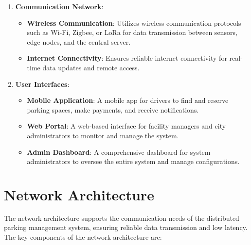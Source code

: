 \documentclass[oneside, 12pt, a4paper, draft]{book}
\begin{document}
\begin{enumerate}
\item \textbf{\textbf{Communication Network}}:
\begin{itemize}
\item \textbf{\textbf{Wireless Communication}}: Utilizes wireless communication protocols such as Wi-Fi, Zigbee, or LoRa for data transmission between sensors, edge nodes, and the central server.
\item \textbf{\textbf{Internet Connectivity}}: Ensures reliable internet connectivity for real-time data updates and remote access.
\end{itemize}

\item \textbf{\textbf{User Interfaces}}:
\begin{itemize}
\item \textbf{\textbf{Mobile Application}}: A mobile app for drivers to find and reserve parking spaces, make payments, and receive notifications.
\item \textbf{\textbf{Web Portal}}: A web-based interface for facility managers and city administrators to monitor and manage the system.
\item \textbf{\textbf{Admin Dashboard}}: A comprehensive dashboard for system administrators to oversee the entire system and manage configurations.
\end{itemize}
\end{enumerate}
\section{Network Architecture}
\label{sec:orgc797047}
The network architecture supports the communication needs of the distributed parking management system, ensuring reliable data transmission and low latency. The key components of the network architecture are:
\end{document}
